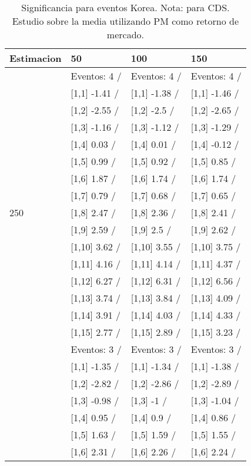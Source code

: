 \begin{table}

\caption{Significancia para eventos Korea. Nota: para CDS. Estudio sobre la media utilizando PM como retorno de mercado.}
\centering
\begin{tabular}[t]{llll}
\toprule
Estimacion & 50 & 100 & 150\\
\midrule
 & Eventos:  4 / & Eventos:  4 / & Eventos:  4 /\\
 & {}[1,1] -1.41  / & {}[1,1] -1.38  / & {}[1,1] -1.46  /\\
 & {}[1,2] -2.55  / & {}[1,2] -2.5  / & {}[1,2] -2.65  /\\
 & {}[1,3] -1.16  / & {}[1,3] -1.12  / & {}[1,3] -1.29  /\\
 & {}[1,4] 0.03  / & {}[1,4] 0.01  / & {}[1,4] -0.12  /\\
\addlinespace
 & {}[1,5] 0.99  / & {}[1,5] 0.92  / & {}[1,5] 0.85  /\\
 & {}[1,6] 1.87  / & {}[1,6] 1.74  / & {}[1,6] 1.74  /\\
 & {}[1,7] 0.79  / & {}[1,7] 0.68  / & {}[1,7] 0.65  /\\
250 & {}[1,8] 2.47  / & {}[1,8] 2.36  / & {}[1,8] 2.41  /\\
 & {}[1,9] 2.59  / & {}[1,9] 2.5  / & {}[1,9] 2.62  /\\
\addlinespace
 & {}[1,10] 3.62  / & {}[1,10] 3.55  / & {}[1,10] 3.75  /\\
 & {}[1,11] 4.16  / & {}[1,11] 4.14  / & {}[1,11] 4.37  /\\
 & {}[1,12] 6.27  / & {}[1,12] 6.31  / & {}[1,12] 6.56  /\\
 & {}[1,13] 3.74  / & {}[1,13] 3.84  / & {}[1,13] 4.09  /\\
 & {}[1,14] 3.91  / & {}[1,14] 4.03  / & {}[1,14] 4.33  /\\
\addlinespace
 & {}[1,15] 2.77  / & {}[1,15] 2.89  / & {}[1,15] 3.23  /\\
 & Eventos:  3 / & Eventos:  3 / & Eventos:  3 /\\
 & {}[1,1] -1.35  / & {}[1,1] -1.34  / & {}[1,1] -1.38  /\\
 & {}[1,2] -2.82  / & {}[1,2] -2.86  / & {}[1,2] -2.89  /\\
 & {}[1,3] -0.98  / & {}[1,3] -1  / & {}[1,3] -1.04  /\\
\addlinespace
 & {}[1,4] 0.95  / & {}[1,4] 0.9  / & {}[1,4] 0.86  /\\
 & {}[1,5] 1.63  / & {}[1,5] 1.59  / & {}[1,5] 1.55  /\\
 & {}[1,6] 2.31  / & {}[1,6] 2.26  / & {}[1,6] 2.24  /\\

\end{tabular}
\end{table}
